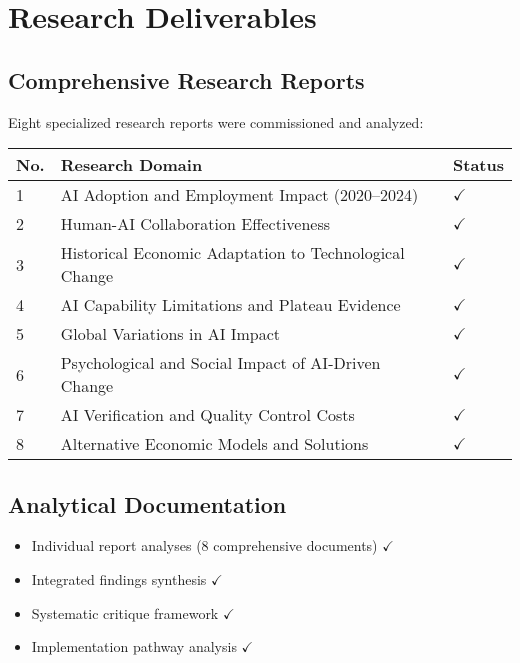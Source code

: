 \documentclass[11pt,a4paper]{article}
\newcommand{\greencheckmark}{\textcolor{successgreen}{\textbf{$\checkmark$}}}
\begin{document}
\pagebreak
\section{Research Deliverables}

\subsection{Comprehensive Research Reports}

Eight specialized research reports were commissioned and analyzed:

\begin{longtable}{p{} p{} p{}}
\toprule
\textbf{No.} & \textbf{Research Domain} & \textbf{Status} \\
\midrule
1 & AI Adoption and Employment Impact (2020--2024) & \greencheckmark \\
2 & Human-AI Collaboration Effectiveness & \greencheckmark \\
3 & Historical Economic Adaptation to Technological Change & \greencheckmark \\
4 & AI Capability Limitations and Plateau Evidence & \greencheckmark \\
5 & Global Variations in AI Impact & \greencheckmark \\
6 & Psychological and Social Impact of AI-Driven Change & \greencheckmark \\
7 & AI Verification and Quality Control Costs & \greencheckmark \\
8 & Alternative Economic Models and Solutions & \greencheckmark \\
\bottomrule
\end{longtable}

\subsection{Analytical Documentation}

\begin{itemize}[leftmargin=*]
\item Individual report analyses (8 comprehensive documents) \greencheckmark
\item Integrated findings synthesis \greencheckmark
\item Systematic critique framework \greencheckmark
\item Implementation pathway analysis \greencheckmark
\end{itemize}
\end{document}
